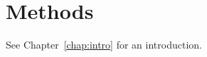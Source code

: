 \chapter{Methods\label{chap:methods}}

See Chapter~\ref{chap:intro} for an introduction. 
\lipsum[81]

\lipsum[36-70]